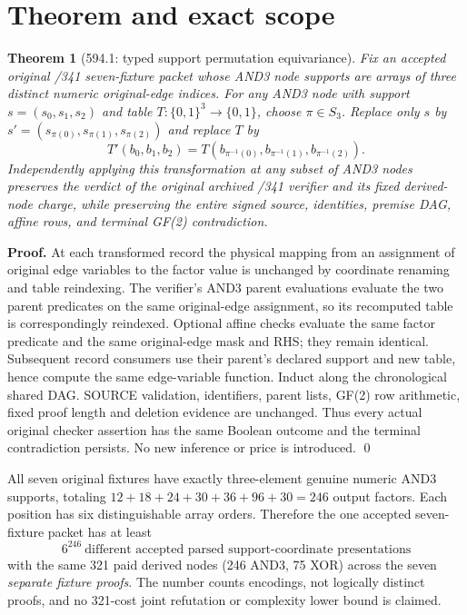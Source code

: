 \documentclass[11pt]{article}
\newtheorem{theorem}{Theorem}
\begin{document}
\section*{Theorem and exact scope}
\begin{theorem}[594.1: typed support permutation equivariance]
Fix an accepted original /341 seven-fixture packet whose AND3 node supports are arrays of three distinct numeric original-edge indices. For any AND3 node with support $s=(s_0,s_1,s_2)$ and table $T:\{0,1\}^3\to\{0,1\}$, choose $\pi\in S_3$. Replace only $s$ by $s'=(s_{\pi(0)},s_{\pi(1)},s_{\pi(2)})$ and replace $T$ by
\[
 T'(b_0,b_1,b_2)=T(b_{\pi^{-1}(0)},b_{\pi^{-1}(1)},b_{\pi^{-1}(2)}).
\]
Independently applying this transformation at any subset of AND3 nodes preserves the verdict of the original archived /341 verifier and its fixed derived-node charge, while preserving the entire signed source, identities, premise DAG, affine rows, and terminal GF(2) contradiction.
\end{theorem}
\noindent\textbf{Proof.} At each transformed record the physical mapping from an assignment of original edge variables to the factor value is unchanged by coordinate renaming and table reindexing. The verifier's AND3 parent evaluations evaluate the two parent predicates on the same original-edge assignment, so its recomputed table is correspondingly reindexed. Optional affine checks evaluate the same factor predicate and the same original-edge mask and RHS; they remain identical. Subsequent record consumers use their parent's declared support and new table, hence compute the same edge-variable function. Induct along the chronological shared DAG. SOURCE validation, identifiers, parent lists, GF(2) row arithmetic, fixed proof length and deletion evidence are unchanged. Thus every actual original checker assertion has the same Boolean outcome and the terminal contradiction persists. No new inference or price is introduced. \qed

\noindent All seven original fixtures have exactly three-element genuine numeric AND3 supports, totaling $12+18+24+30+36+96+30=246$ output factors. Each position has six distinguishable array orders. Therefore the one accepted seven-fixture packet has at least
\[
 \boxed{6^{246}\ \text{different accepted parsed support-coordinate presentations}}
\]
with the same 321 paid derived nodes (246 AND3, 75 XOR) across the seven \emph{separate fixture proofs}. The number counts encodings, not logically distinct proofs, and no 321-cost joint refutation or complexity lower bound is claimed.
\end{document}
